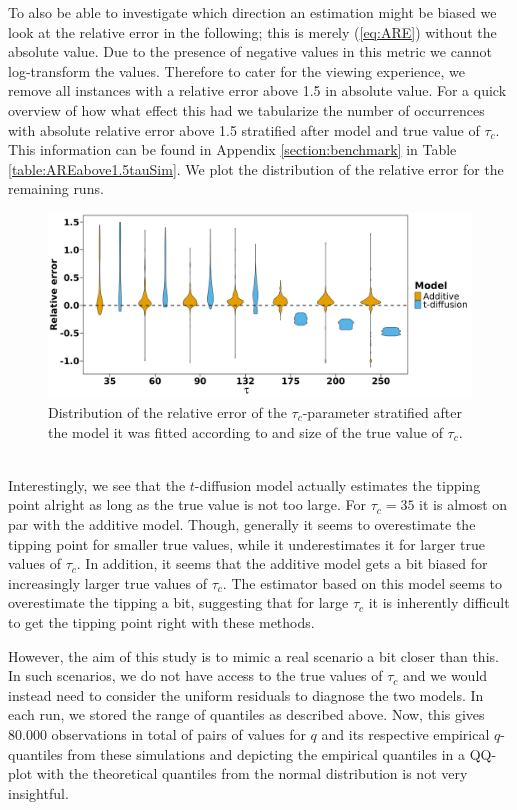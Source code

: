 To also be able to investigate which direction an estimation might be biased we look at the relative error in the following; this is merely (\ref{eq:ARE}) without the absolute value. Due to the presence of negative values in this metric we cannot log-transform the values. Therefore to cater for the viewing experience, we remove all instances with a relative error above 1.5 in absolute value. For a quick overview of how what effect this had we tabularize the number of occurrences with absolute relative error above 1.5 stratified after model and true value of $\tau_c$. This information can be found in Appendix \ref{section:benchmark} in Table \ref{table:AREabove1.5tauSim}. We plot the distribution of the relative error for the remaining runs.
\begin{figure}[h!]
    \begin{center}
    \includegraphics[scale = .07]{figures/RE_dist_tau.jpeg}
    \caption{Distribution of the relative error of the $\tau_c$-parameter stratified after the model it was fitted according to and size of the true value of $\tau_c$.}
    \label{figure:RE_dist_tau}
    \end{center}
\end{figure}\\
Interestingly, we see that the $t$-diffusion model actually estimates the tipping point alright as long as the true value is not too large. For $\tau_c = 35$ it is almost on par with the additive model. Though, generally it seems to overestimate the tipping point for smaller true values, while it underestimates it for larger true values of $\tau_c$. In addition, it seems that the additive model gets a bit biased for increasingly larger true values of $\tau_c$. The estimator based on this model seems to overestimate the tipping a bit, suggesting that for large $\tau_c$ it is inherently difficult to get the tipping point right with these methods.

However, the aim of this study is to mimic a real scenario a bit closer than this. In such scenarios, we do not have access to the true values of $\tau_c$ and we would instead need to consider the uniform residuals to diagnose the two models. In each run, we stored the range of quantiles as described above. Now, this gives $80.000$ observations in total of pairs of values for $q$ and its respective empirical $q$-quantiles from these simulations and depicting the empirical quantiles in a QQ-plot with the theoretical quantiles from the normal distribution is not very insightful.

